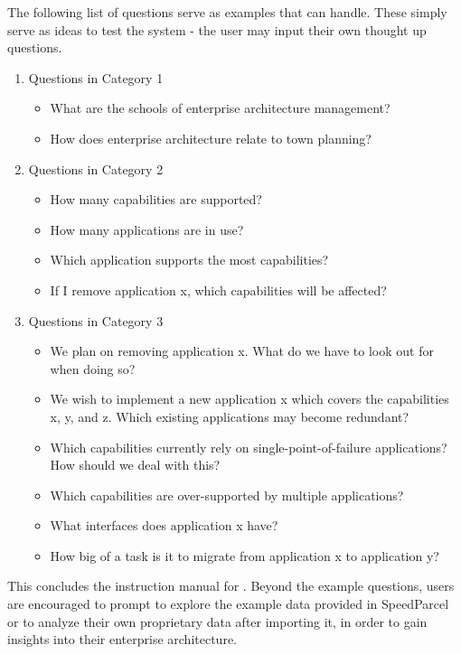 The following list of questions serve as examples that \prototype{} can handle. These simply serve as ideas to test the system - the user may input their own thought up questions.
 
\begin{enumerate}
   \item Questions in Category 1
   \begin{itemize}
     \item What are the schools of enterprise architecture management?
     \item How does enterprise architecture relate to town planning?
   \end{itemize}
    \item Questions in Category 2
   \begin{itemize}
     \item How many capabilities are supported?
     \item How many applications are in use?
     \item Which application supports the most capabilities?
     \item If I remove application x, which capabilities will be affected?
   \end{itemize}
    \item Questions in Category 3
   \begin{itemize}
     \item We plan on removing application x. What do we have to look out for when doing so?
     \item We wish to implement a new application x which covers the capabilities x, y, and z. Which existing applications may become redundant?
     \item Which capabilities currently rely on single-point-of-failure applications? How should we deal with this?
     \item Which capabilities are over-supported by multiple applications?
     \item What interfaces does application x have?
     \item How big of a task is it to migrate from application x to application y?
   \end{itemize}
\end{enumerate}

This concludes the instruction manual for \prototype{}. Beyond the example questions, users are encouraged to prompt \prototype{} to explore the example data provided in SpeedParcel or to analyze their own proprietary data after importing it, in order to gain insights into their enterprise architecture.

